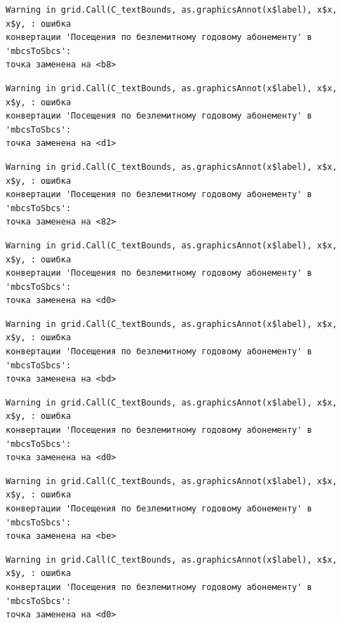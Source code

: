 \documentclass[
  letterpaper,
  DIV=11,
  numbers=noendperiod]{scrreprt}
\begin{document}
\begin{verbatim}
Warning in grid.Call(C_textBounds, as.graphicsAnnot(x$label), x$x, x$y, : ошибка
конвертации 'Посещения по безлемитному годовому абонементу' в 'mbcsToSbcs':
точка заменена на <b8>
\end{verbatim}

\begin{verbatim}
Warning in grid.Call(C_textBounds, as.graphicsAnnot(x$label), x$x, x$y, : ошибка
конвертации 'Посещения по безлемитному годовому абонементу' в 'mbcsToSbcs':
точка заменена на <d1>
\end{verbatim}

\begin{verbatim}
Warning in grid.Call(C_textBounds, as.graphicsAnnot(x$label), x$x, x$y, : ошибка
конвертации 'Посещения по безлемитному годовому абонементу' в 'mbcsToSbcs':
точка заменена на <82>
\end{verbatim}

\begin{verbatim}
Warning in grid.Call(C_textBounds, as.graphicsAnnot(x$label), x$x, x$y, : ошибка
конвертации 'Посещения по безлемитному годовому абонементу' в 'mbcsToSbcs':
точка заменена на <d0>
\end{verbatim}

\begin{verbatim}
Warning in grid.Call(C_textBounds, as.graphicsAnnot(x$label), x$x, x$y, : ошибка
конвертации 'Посещения по безлемитному годовому абонементу' в 'mbcsToSbcs':
точка заменена на <bd>
\end{verbatim}

\begin{verbatim}
Warning in grid.Call(C_textBounds, as.graphicsAnnot(x$label), x$x, x$y, : ошибка
конвертации 'Посещения по безлемитному годовому абонементу' в 'mbcsToSbcs':
точка заменена на <d0>
\end{verbatim}

\begin{verbatim}
Warning in grid.Call(C_textBounds, as.graphicsAnnot(x$label), x$x, x$y, : ошибка
конвертации 'Посещения по безлемитному годовому абонементу' в 'mbcsToSbcs':
точка заменена на <be>
\end{verbatim}

\begin{verbatim}
Warning in grid.Call(C_textBounds, as.graphicsAnnot(x$label), x$x, x$y, : ошибка
конвертации 'Посещения по безлемитному годовому абонементу' в 'mbcsToSbcs':
точка заменена на <d0>
\end{verbatim}
\end{document}
